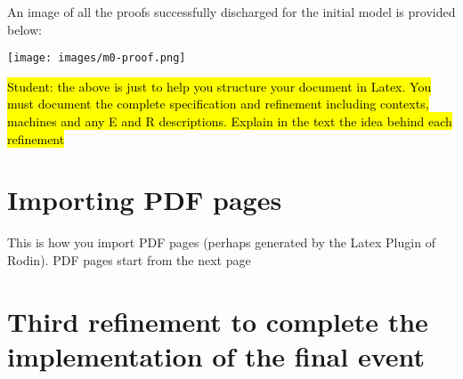 \documentclass[runningheads,12pt]{article}
\begin{document}
An image of all the proofs successfully discharged for the initial model is provided below:

\texttt{[image: images/m0-proof.png]}


\bigskip
\hl{Student: the above is just to help you structure your document in Latex. You must document the complete specification and refinement including contexts, machines and any E and R descriptions. Explain in the text the idea behind each refinement}

\clearpage
\section{Importing PDF pages}
This is how you import PDF pages (perhaps generated by the Latex Plugin of Rodin). PDF pages start from the next page




\clearpage
\section{Third refinement to complete the implementation of the final event}


\end{document}
